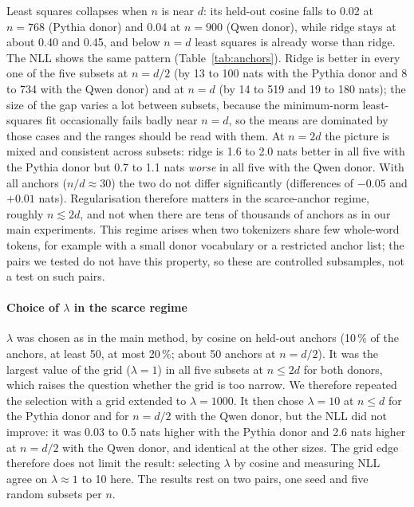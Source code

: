 \documentclass[preprint,12pt]{elsarticle}
\begin{document}
Least squares collapses when $n$ is near $d$: its held-out cosine falls to 0.02 at $n=768$ (Pythia donor) and 0.04 at $n=900$ (Qwen donor), while ridge stays at about 0.40 and 0.45, and below $n=d$ least squares is already worse than ridge. The NLL shows the same pattern (Table~\ref{tab:anchors}). Ridge is better in every one of the five subsets at $n=d/2$ (by 13 to 100 nats with the Pythia donor and 8 to 734 with the Qwen donor) and at $n=d$ (by 14 to 519 and 19 to 180 nats); the size of the gap varies a lot between subsets, because the minimum-norm least-squares fit occasionally fails badly near $n=d$, so the means are dominated by those cases and the ranges should be read with them. At $n=2d$ the picture is mixed and consistent across subsets: ridge is 1.6 to 2.0 nats better in all five with the Pythia donor but 0.7 to 1.1 nats \emph{worse} in all five with the Qwen donor. With all anchors ($n/d\approx30$) the two do not differ significantly (differences of $-0.05$ and $+0.01$ nats). Regularisation therefore matters in the scarce-anchor regime, roughly $n\lesssim 2d$, and not when there are tens of thousands of anchors as in our main experiments. This regime arises when two tokenizers share few whole-word tokens, for example with a small donor vocabulary or a restricted anchor list; the pairs we tested do not have this property, so these are controlled subsamples, not a test on such pairs.

\paragraph{Choice of $\lambda$ in the scarce regime} $\lambda$ was chosen as in the main method, by cosine on held-out anchors (10\,\% of the anchors, at least 50, at most 20\,\%; about 50 anchors at $n=d/2$). It was the largest value of the grid ($\lambda=1$) in all five subsets at $n\le2d$ for both donors, which raises the question whether the grid is too narrow. We therefore repeated the selection with a grid extended to $\lambda=1000$. It then chose $\lambda=10$ at $n\le d$ for the Pythia donor and for $n=d/2$ with the Qwen donor, but the NLL did not improve: it was 0.03 to 0.5 nats higher with the Pythia donor and 2.6 nats higher at $n=d/2$ with the Qwen donor, and identical at the other sizes. The grid edge therefore does not limit the result: selecting $\lambda$ by cosine and measuring NLL agree on $\lambda\approx1$ to 10 here. The results rest on two pairs, one seed and five random subsets per $n$.
\end{document}
